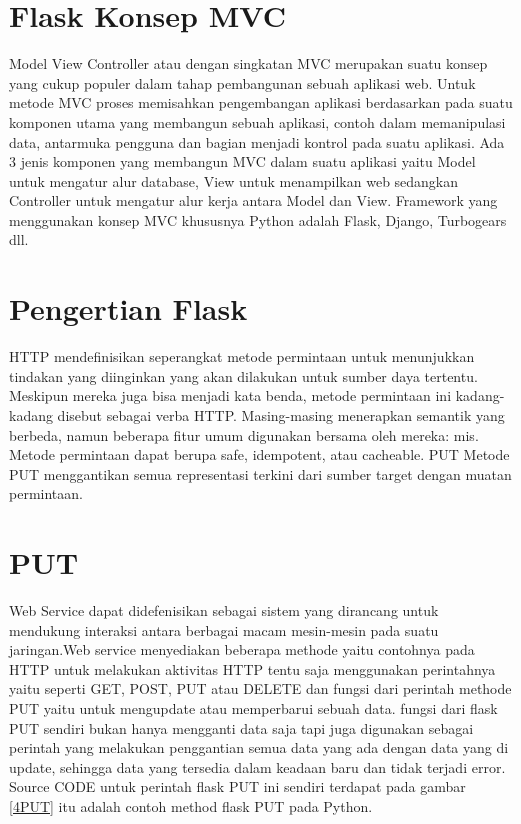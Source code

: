 \section{Flask Konsep MVC}
Model View Controller atau dengan singkatan MVC merupakan suatu konsep yang cukup populer dalam tahap pembangunan sebuah aplikasi web. 
Untuk metode MVC proses memisahkan pengembangan aplikasi berdasarkan pada suatu komponen utama yang membangun sebuah aplikasi, 
contoh dalam memanipulasi data, antarmuka pengguna dan bagian menjadi kontrol pada suatu aplikasi. 
Ada 3 jenis komponen yang membangun MVC dalam suatu aplikasi yaitu Model untuk mengatur alur database, View untuk menampilkan web sedangkan Controller untuk mengatur alur kerja antara Model dan View. 
Framework yang menggunakan konsep MVC khususnya Python adalah Flask, Django, Turbogears dll.

\section{Pengertian Flask}
HTTP mendefinisikan seperangkat metode permintaan untuk menunjukkan tindakan yang diinginkan yang akan dilakukan untuk sumber daya tertentu. Meskipun mereka juga bisa menjadi kata benda, metode permintaan ini kadang-kadang disebut sebagai verba HTTP. Masing-masing menerapkan semantik yang berbeda, namun beberapa fitur umum digunakan bersama oleh mereka: mis. Metode permintaan dapat berupa safe, idempotent, atau cacheable.
PUT
Metode PUT menggantikan semua representasi terkini dari sumber target dengan muatan permintaan.

\section{PUT}
Web Service dapat didefenisikan sebagai sistem yang dirancang untuk mendukung interaksi antara berbagai macam mesin-mesin pada suatu jaringan.Web service menyediakan beberapa methode yaitu contohnya pada  HTTP untuk melakukan aktivitas HTTP tentu saja menggunakan perintahnya yaitu seperti  GET, POST, PUT atau DELETE dan fungsi dari perintah methode PUT yaitu untuk mengupdate atau memperbarui sebuah data.
fungsi dari flask PUT sendiri bukan hanya mengganti data saja tapi
juga digunakan sebagai perintah yang melakukan
penggantian semua data yang ada dengan data yang di update, sehingga
data yang tersedia dalam keadaan baru dan tidak terjadi error.
Source CODE untuk perintah flask PUT ini sendiri terdapat pada gambar \ref{4PUT} 
itu adalah contoh method flask PUT pada Python.

